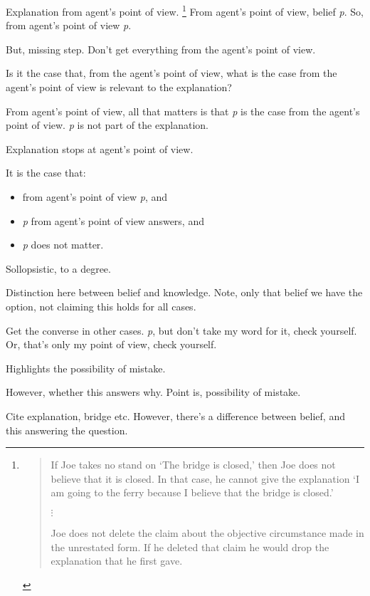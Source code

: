 \begin{note}[Distinction]
  Explanation from agent's point of view.%
  \footnote{
    \begin{quote}
      If Joe takes no stand on ‘The bridge is closed,’ then Joe does not believe that it is closed. In that case, he cannot give the explanation ‘I am going to the ferry because I believe that the bridge is closed.’

      \mbox{}\hfill\(\vdots\)\hfill\mbox{}

      Joe does not delete the claim about the objective circumstance made in the unrestated form.
      If he deleted that claim he would drop the explanation that he first gave.
      \cite[113--114]{Collins:1997wn}
    \end{quote}

  }
  From agent's point of view, belief \emph{p}.
  So, from agent's point of view \emph{p}.

  But, missing step.
  Don't get everything from the agent's point of view.

  Is it the case that, from the agent's point of view, what is the case from the agent's point of view is relevant to the explanation?

  From agent's point of view, all that matters is that \emph{p} is the case from the agent's point of view.
  \emph{p} is not part of the explanation.

  Explanation stops at agent's point of view.

  It is the case that:
  \begin{itemize}
  \item
    from agent's point of view \emph{p}, and
  \item
    \emph{p} from agent's point of view answers, and
  \item
    \emph{p} does not matter.
  \end{itemize}

  Sollopsistic, to a degree.

  Distinction here between belief and knowledge.
  Note, only that belief we have the option, not claiming this holds for all cases.

  Get the converse in other cases.
  \emph{p}, but don't take my word for it, check yourself.
  Or, that's only my point of view, check yourself.

  Highlights the possibility of mistake.


  However, whether this answers why.
  Point is, possibility of mistake.

  Cite explanation, bridge etc.
  However, there's a difference between belief, and this answering the question.


\end{note}
